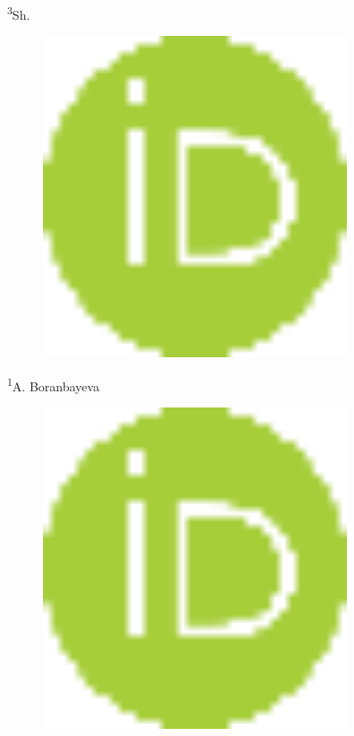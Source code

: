 {{\textsuperscript{3}Sh.
\begin{figure}[H]
	\centering
	\includegraphics[width=0.8\textwidth]{media/ekon2/image10}
	\caption*{}
\end{figure}

\textsuperscript{1}A. Boranbayeva}
\begin{figure}[H]
	\centering
	\includegraphics[width=0.8\textwidth]{media/ekon2/image10}
	\caption*{}
\end{figure}

}
